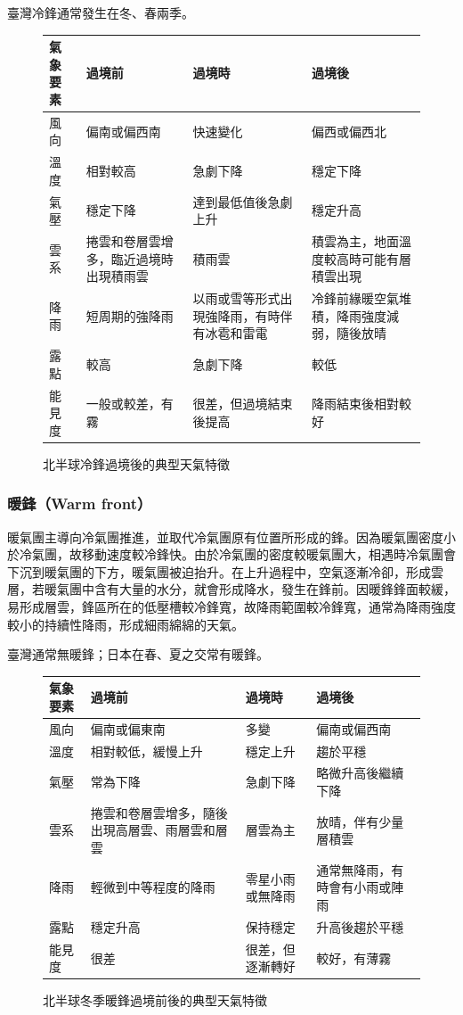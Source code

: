 \documentclass[a4paper,12pt]{report}
\begin{document}
\begin{itemize}
臺灣冷鋒通常發生在冬、春兩季。
\bct
\begin{figure}[H]
\centering
\begin{tabular}{|p{}|p{}|p{}|p{}|}
\hline
氣象要素 & 過境前 & 過境時 & 過境後 \\ \hline
風向 & 偏南或偏西南 & 快速變化 & 偏西或偏西北 \\ \hline
溫度 & 相對較高 & 急劇下降 & 穩定下降 \\ \hline
氣壓 & 穩定下降 & 達到最低值後急劇上升 & 穩定升高 \\ \hline
雲系 & 捲雲和卷層雲增多，臨近過境時出現積雨雲 & 積雨雲 & 積雲為主，地面溫度較高時可能有層積雲出現 \\ \hline
降雨 & 短周期的強降雨 & 以雨或雪等形式出現強降雨，有時伴有冰雹和雷電 & 冷鋒前緣暖空氣堆積，降雨強度減弱，隨後放晴 \\ \hline
露點 & 較高 & 急劇下降 & 較低 \\ \hline
能見度 & 一般或較差，有霧 & 很差，但過境結束後提高 & 降雨結束後相對較好 \\ \hline
\end{tabular}
\caption{北半球冷鋒過境後的典型天氣特徵}
\end{figure}\FB\ect
\subsubsection{暖鋒（Warm front）}
暖氣團主導向冷氣團推進，並取代冷氣團原有位置所形成的鋒。因為暖氣團密度小於冷氣團，故移動速度較冷鋒快。由於冷氣團的密度較暖氣團大，相遇時冷氣團會下沉到暖氣團的下方，暖氣團被迫抬升。在上升過程中，空氣逐漸冷卻，形成雲層，若暖氣團中含有大量的水分，就會形成降水，發生在鋒前。因暖鋒鋒面較緩，易形成層雲，鋒區所在的低壓槽較冷鋒寬，故降雨範圍較冷鋒寬，通常為降雨強度較小的持續性降雨，形成細雨綿綿的天氣。

臺灣通常無暖鋒；日本在春、夏之交常有暖鋒。
\bct
\begin{figure}[H]
\centering
\begin{tabular}{|p{}|p{}|p{}|p{}|}
\hline
氣象要素 & 過境前 & 過境時 & 過境後 \\ \hline
風向 & 偏南或偏東南 & 多變 & 偏南或偏西南 \\ \hline
溫度 & 相對較低，緩慢上升 & 穩定上升 & 趨於平穩 \\ \hline
氣壓 & 常為下降 & 急劇下降 & 略微升高後繼續下降 \\ \hline
雲系 & 捲雲和卷層雲增多，隨後出現高層雲、雨層雲和層雲 & 層雲為主 & 放晴，伴有少量層積雲 \\ \hline
降雨 & 輕微到中等程度的降雨 & 零星小雨或無降雨 & 通常無降雨，有時會有小雨或陣雨 \\ \hline
露點 & 穩定升高 & 保持穩定 & 升高後趨於平穩 \\ \hline
能見度 & 很差 & 很差，但逐漸轉好 & 較好，有薄霧 \\ \hline
\end{tabular}
\caption{北半球冬季暖鋒過境前後的典型天氣特徵}
\end{figure}\FB\ect

\end{itemize}
\end{document}
